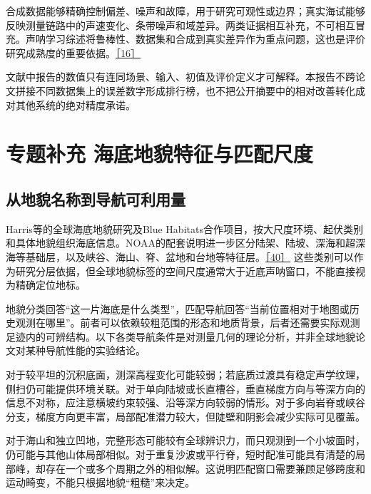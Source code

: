 合成数据能够精确控制偏差、噪声和故障，用于研究可观性或边界；真实海试能够反映测量链路中的声速变化、条带噪声和域差异。两类证据相互补充，不可相互冒充。声呐学习综述将鲁棒性、数据集和合成到真实差异作为重点问题，这也是评价研究成熟度的重要依据。\href{https://arxiv.org/abs/2412.11840}{［16］}

文献中报告的数值只有连同场景、输入、初值及评价定义才可解释。本报告不跨论文拼接不同数据集上的误差数字形成排行榜，也不把公开摘要中的相对改善转化成对其他系统的绝对精度承诺。

\hypertarget{ux4e13ux9898ux8865ux5145-ux6d77ux5e95ux5730ux8c8cux7279ux5f81ux4e0eux5339ux914dux5c3aux5ea6}{%
\section{专题补充 海底地貌特征与匹配尺度}\label{ux4e13ux9898ux8865ux5145-ux6d77ux5e95ux5730ux8c8cux7279ux5f81ux4e0eux5339ux914dux5c3aux5ea6}}

\hypertarget{ux4eceux5730ux8c8cux540dux79f0ux5230ux5bfcux822aux53efux5229ux7528ux91cf}{%
\subsection{从地貌名称到导航可利用量}\label{ux4eceux5730ux8c8cux540dux79f0ux5230ux5bfcux822aux53efux5229ux7528ux91cf}}

Harris等的全球海底地貌研究及Blue Habitats合作项目，按大尺度环境、起伏类别和具体地貌组织海底信息。NOAA的配套说明进一步区分陆架、陆坡、深海和超深海等基础层，以及峡谷、海山、脊、盆地和台地等特征层。\href{https://bluehabitats.org/}{［40］} 这些类别可以作为研究分层依据，但全球地貌标签的空间尺度通常大于近底声呐窗口，不能直接视为精确定位地标。

地貌分类回答``这一片海底是什么类型''，匹配导航回答``当前位置相对于地图或历史观测在哪里''。前者可以依赖较粗范围的形态和地质背景，后者还需要实际观测足迹内的可辨结构。以下各类导航条件是对测量几何的理论分析，并非全球地貌论文对某种导航性能的实验结论。

对于较平坦的沉积底面，测深高程变化可能较弱；若底质过渡具有稳定声学纹理，侧扫仍可能提供环境关联。对于单向陆坡或长直槽谷，垂直梯度方向与等深方向的信息不对称，应注意横坡约束较强、沿等深方向较弱的情形。对于多向岩脊或峡谷分支，梯度方向更丰富，局部配准潜力较大，但陡壁和阴影会减少实际可见覆盖。

对于海山和独立凹地，完整形态可能较有全球辨识力，而只观测到一个小坡面时，仍可能与其他山体局部相似。对于重复沙波或平行脊，短时配准可能具有清楚的局部峰，却存在一个或多个周期之外的相似解。这说明匹配窗口需要兼顾足够跨度和运动畸变，不能只根据地貌``粗糙''来决定。


